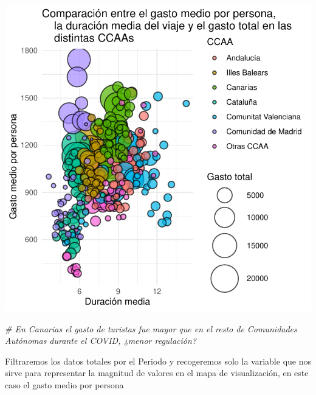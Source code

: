 \documentclass[data,article,submit,moreauthors,pdftex]{Definitions/mdpi}
\newenvironment{Shaded}{\begin{snugshade}}{\end{snugshade}}
\newcommand{\CommentTok}[1]{\textcolor[rgb]{0.56,0.35,0.01}{\textit{#1}}}
\begin{document}
\includegraphics{ProyectoAED2024_Rmd_files/figure-latex/unnamed-chunk-24-1.pdf}

\begin{Shaded}
\begin{Highlighting}[]
\CommentTok{\# En Canarias el gasto de turistas fue mayor que en el resto de Comunidades Autónomas durante el COVID, ¿menor regulación?}
\end{Highlighting}
\end{Shaded}

Filtraremos los datos totales por el Periodo y recogeremos solo la
variable que nos sirve para representar la magnitud de valores en el
mapa de visualización, en este caso el gasto medio por persona
\end{document}

